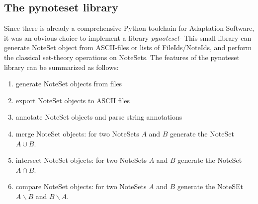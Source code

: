 \subsection{The pynoteset library}
Since there is already a comprehensive Python toolchain for Adaptation Software, it was an obvious choice to implement a library  \emph{pynoteset}-  This small library can generate NoteSet object from ASCII-files or lists of FileIds/NoteIds, and perform the classical set-theory operations on NoteSets. The features of the pynoteset library can be summarized as follows: 
\begin{enumerate}
\item generate NoteSet objects from files
\item export NoteSet objects to ASCII files
\item annotate NoteSet objects and parse string annotations
\item merge NoteSet objects: for two NoteSets $A$ and $B$ generate the NoteSet $A \cup B$.
\item intersect NoteSet objects: for two NoteSets $A$ and $B$ generate the NoteSet $A \cap B$.
\item compare NoteSet objects: for two NoteSets $A$ and $B$ generate the NoteSEt $A\backslash B$ and $B\backslash A$. 
\end{enumerate}

